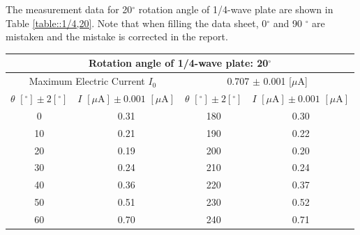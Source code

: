\documentclass[a4paper]{article}
\begin{document}
The measurement data for 20$^\circ$ rotation angle of 1/4-wave plate are shown in Table \ref{table::1/4,20}.  Note that when filling the data sheet, 0$^\circ$ and 90 $^\circ$ are mistaken and the mistake is corrected in the report.

\begin{table}[H]
	\centering
	\begin{tabular}{cc||cc}
		\multicolumn{4}{c}{Rotation angle of 1/4-wave plate: 20$^\circ$}                                                                                                                            \\
		\hline
		\multicolumn{2}{c}{Maximum Electric Current $I_0$} & \multicolumn{2}{c}{0.707 $\pm$ 0.001 [$\mu$A]}                                                                                         \\
		\hline
		$\theta\,\,[^\circ] \pm 2[^\circ]$                 & $I\,\,[\mu\text{A}] \pm 0.001\,\,[\mu\text{A}]$ & $\theta\,\,[^\circ] \pm 2[^\circ]$ & $I\,\,[\mu\text{A}] \pm 0.001\,\,[\mu\text{A}]$ \\
		\hline
		0                                                  & 0.31                                            & 180                                & 0.30                                            \\
		10                                                 & 0.21                                            & 190                                & 0.22                                            \\
		20                                                 & 0.19                                            & 200                                & 0.20                                            \\
		30                                                 & 0.24                                            & 210                                & 0.24                                            \\
		40                                                 & 0.36                                            & 220                                & 0.37                                            \\
		50                                                 & 0.51                                            & 230                                & 0.52                                            \\
		60                                                 & 0.70                                            & 240                                & 0.71                                            \\

\end{tabular}
\end{table}
\end{document}
